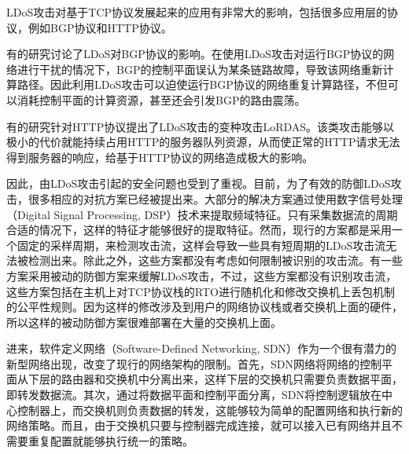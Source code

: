 LDoS攻击对基于TCP协议发展起来的应用有非常大的影响，包括很多应用层的协议，例如BGP协议和HTTP协议。

有的研究\cite{b2}讨论了LDoS对BGP协议的影响。在使用LDoS攻击对运行BGP协议的网络进行干扰的情况下，BGP的控制平面误认为某条链路故障，导致该网络重新计算路径。因此利用LDoS攻击可以迫使运行BGP协议的网络重复计算路径，不但可以消耗控制平面的计算资源，甚至还会引发BGP的路由震荡。

有的研究\cite{Maci2007LoRDAS}针对HTTP协议提出了LDoS攻击的变种攻击LoRDAS。该类攻击能够以极小的代价就能持续占用HTTP的服务器队列资源，从而使正常的HTTP请求无法得到服务器的响应，给基于HTTP协议的网络造成极大的影响。


因此，由LDoS攻击引起的安全问题也受到了重视。目前，为了有效的防御LDoS攻击，很多相应的对抗方案已经被提出来。大部分的解决方案\cite{b1,b4, b6, b7, b22}通过使用数字信号处理（Digital Signal Processing, DSP）技术来提取频域特征。只有采集数据流的周期合适的情况下，这样的特征才能够很好的提取特征。然而，现行的方案都是采用一个固定的采样周期，来检测攻击流，这样会导致一些具有短周期的LDoS攻击流无法被检测出来。除此之外，这些方案都没有考虑如何限制被识别的攻击流。有一些方案采用被动的防御方案来缓解LDoS攻击，不过，这些方案都没有识别攻击流，这些方案包括在主机上对TCP协议栈的RTO进行随机化\cite{b17}和修改交换机上丢包机制的公平性规则\cite{b8}。因为这样的修改涉及到用户的网络协议栈或者交换机上面的硬件，所以这样的被动防御方案很难部署在大量的交换机上面。

进来，软件定义网络（Software-Defined Networking, SDN）作为一个很有潜力的新型网络出现，改变了现行的网络架构的限制。首先，SDN网络将网络的控制平面从下层的路由器和交换机中分离出来，这样下层的交换机只需要负责数据平面，即转发数据流。其次，通过将数据平面和控制平面分离，SDN将控制逻辑放在中心控制器上，而交换机则负责数据的转发，这能够较为简单的配置网络和执行新的网络策略。而且，由于交换机只要与控制器完成连接，就可以接入已有网络并且不需要重复配置就能够执行统一的策略。



